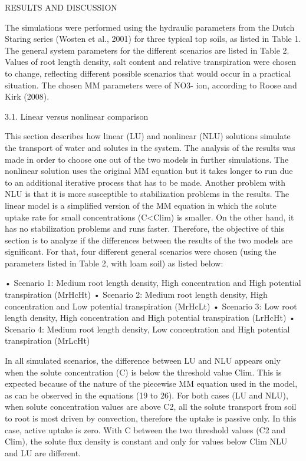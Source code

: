 \cleardoublepage
\chap RESULTS AND DISCUSSION

The simulations were performed using the hydraulic parameters from the Dutch Staring series (Wosten et al., 2001) for three typical top soils, as listed in Table 1. The general system parameters for the different scenarios are listed in Table 2. Values of root length density, salt content and relative transpiration were chosen to change, reflecting different possible scenarios that would occur in a practical situation. The chosen MM parameters were of NO3- ion, according to Roose and Kirk (2008).

3.1. Linear versus nonlinear comparison

This section describes how linear (LU) and nonlinear (NLU) solutions simulate the transport of water and solutes in the system. The analysis of the results was made in order to choose one out of the two models in further simulations. The nonlinear solution uses the original MM equation but it takes longer to run due to an additional iterative process that has to be made. Another problem with NLU is that it is more susceptible to stabilization problems in the results. The linear model is a simplified version of the MM equation in which the solute uptake rate for small concentrations (C<Clim) is smaller. On the other hand, it has no stabilization problems and runs faster. Therefore, the objective of this section is to analyze if the differences between the results of the two models are significant. For that, four different general scenarios were chosen (using the parameters listed in Table 2, with  loam soil) as listed below:

•	Scenario 1: Medium root length density, High concentration and High potential transpiration (MrHcHt)
•	Scenario 2: Medium root length density, High concentration and Low potential transpiration (MrHcLt)
•	Scenario 3: Low root length density, High concentration and High potential transpiration (LrHcHt)
•	Scenario 4: Medium root length density, Low concentration and High potential transpiration (MrLcHt)

In all simulated scenarios, the difference between LU and NLU appears only when the solute concentration (C) is below the threshold value Clim. This is expected because of the nature of the piecewise MM equation used in the model, as can be observed in the equations (19 to 26). For both cases (LU and NLU), when solute concentration values are above C2, all the solute transport from soil to root is most driven by convection, therefore the uptake is passive only. In this case, active uptake is zero. With C between the two threshold values (C2 and Clim), the solute flux density is constant and only for values below  Clim NLU and LU are different.

